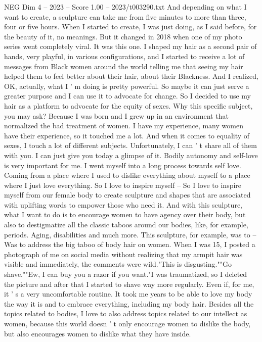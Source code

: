 \begin{textsample}{NEG Dim 4 – 2023 – Score 1.00 – 2023/t003290.txt}
And depending on what I want to create, a sculpture can take me from five minutes to more than three, four or five hours.
When I started to create, I was just doing, as I said before, for the beauty of it, no meanings.
But it changed in 2018 when one of my photo series went completely viral.
It was this one.
I shaped my hair as a second pair of hands, very playful, in various configurations, and I started to receive a lot of messages from Black women around the world telling me that seeing my hair helped them to feel better about their hair, about their Blackness.
And I realized, OK, actually, what I ' m doing is pretty powerful.
So maybe it can just serve a greater purpose and I can use it to advocate for change.
So I decided to use my hair as a platform to advocate for the equity of sexes.
Why this specific subject, you may ask?
Because I was born and I grew up in an environment that normalized the bad treatment of women.
I have my experience, many women have their experience, so it touched me a lot.
And when it comes to equality of sexes, I touch a lot of different subjects.
Unfortunately, I can ' t share all of them with you.
I can just give you today a glimpse of it.
Bodily autonomy and self-love is very important for me.
I went myself into a long process towards self love.
Coming from a place where I used to dislike everything about myself to a place where I just love everything.
So I love to inspire myself -- So I love to inspire myself from our female body to create sculpture and shapes that are associated with uplifting words to empower those who need it.
And with this sculpture, what I want to do is to encourage women to have agency over their body, but also to destigmatize all the classic taboos around our bodies, like, for example, periods.
Aging, disabilities and much more.
This sculpture, for example, was to -- Was to address the big taboo of body hair on women.
When I was 15, I posted a photograph of me on social media without realizing that my armpit hair was visible and immediately, the comments were wild."This is disgusting.""Go shave.""Ew, I can buy you a razor if you want."I was traumatized, so I deleted the picture and after that I started to shave way more regularly.
Even if, for me, it ' s a very uncomfortable routine.
It took me years to be able to love my body the way it is and to embrace everything, including my body hair.
Besides all the topics related to bodies, I love to also address topics related to our intellect as women, because this world doesn ' t only encourage women to dislike the body, but also encourages women to dislike what they have inside.

\end{textsample}
